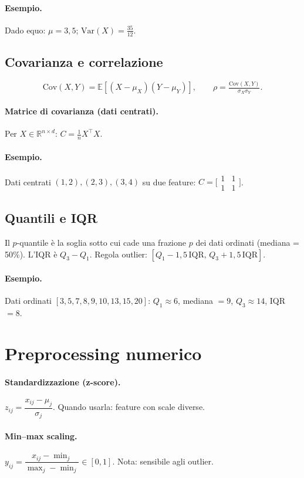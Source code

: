 \paragraph{Esempio.} Dado equo: \(\mu=3{,}5\); \(\mathrm{Var}(X)=\tfrac{35}{12}\).
\subsection{Covarianza e correlazione}
\[\mathrm{Cov}(X,Y)=\mathbb{E}[(X-\mu_X)(Y-\mu_Y)],\qquad \rho=\tfrac{\mathrm{Cov}(X,Y)}{\sigma_X\sigma_Y}.\]
\paragraph{Matrice di covarianza (dati centrati).} Per \(X\in\mathbb{R}^{n\times d}\): \(C=\tfrac{1}{n}X^\top X\).
\paragraph{Esempio.} Dati centrati \((1,2),(2,3),(3,4)\) su due feature: \(C=\bigl[\begin{smallmatrix}1&1\\1&1\end{smallmatrix}\bigr]\).
\subsection{Quantili e IQR}
Il \(p\)-quantile è la soglia sotto cui cade una frazione \(p\) dei dati ordinati (mediana = 50\%). L'IQR è \(Q_3-Q_1\). Regola outlier: \([Q_1-1{,}5\,\mathrm{IQR},\,Q_3+1{,}5\,\mathrm{IQR}]\).
\paragraph{Esempio.} Dati ordinati \([3,5,7,8,9,10,13,15,20]\): \(Q_1\approx6\), mediana \(=9\), \(Q_3\approx14\), IQR \(=8\).

\section{Preprocessing numerico}\label{sec:scaling}
\paragraph{Standardizzazione (z-score).} \(z_{ij}=\dfrac{x_{ij}-\mu_j}{\sigma_j}\). Quando usarla: feature con scale diverse.
\paragraph{Min--max scaling.} \(y_{ij}=\dfrac{x_{ij}-\min_j}{\max_j-\min_j}\in[0,1]\). Nota: sensibile agli outlier.
